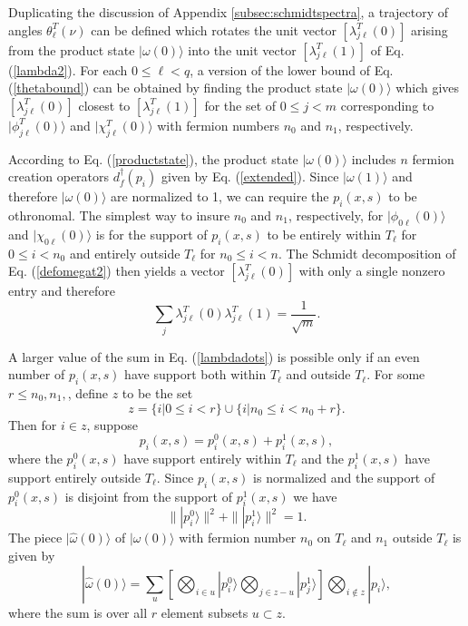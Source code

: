 \documentclass[12pt,amsmath,amssymb,onecolumn]{revtex4-2}
\begin{document}
Duplicating the discussion of Appendix \ref{subsec:schmidtspectra}, a
trajectory of angles $\theta^T_\ell(\nu)$ can be defined which rotates
the unit vector $[ \lambda^T_{j\ell}(0) ]$ arising from the product
state $|\omega(0) \rangle $ into the unit vector $[\lambda^T_{j\ell}(1) ]$ of
Eq. (\ref{lambda2}). For each $0 \le \ell < q$, a version of
the lower bound of Eq. (\ref{thetabound}) can be obtained
by finding the product state $|\omega(0) \rangle $ which gives $[ \lambda^T_{j\ell}(0) ]$ 
closest to $[ \lambda^T_{j\ell}(1) ]$
for the set of $0 \le j < m$
corresponding to $|\phi^T_{j\ell}(0) \rangle $
and $|\chi^T_{j\ell}(0) \rangle $
with
fermion numbers $n_0$ and $n_1$, respectively.

According to Eq. (\ref{productstate}), the product state $|\omega(0) \rangle $ 
includes $n$ fermion creation operators
$ d^\dagger_f( p_i)$ given by
Eq. (\ref{extended}). Since $|\omega(1) \rangle $ and therefore $|\omega(0) \rangle $ are normalized
to 1, we can require the $p_i( x, s)$ 
to be othronomal.
The simplest way to insure $n_0$ and $n_1$, respectively,
for $|\phi_{0\ell}(0) \rangle $
and $|\chi_{0\ell}(0) \rangle $ is for the support of $p_i( x, s)$
to
be entirely within $T_\ell$ for $0 \le i < n_0$ and entirely
outside $T_\ell$ for $n_0 \le i < n$.
The Schmidt decomposition of Eq. (\ref{defomegat2}) then yields
a vector $[ \lambda^T_{j\ell}(0) ]$ with only a single nonzero
entry and therefore
\begin{equation}
  \label{lambdadots}
  \sum_j \lambda^T_{j \ell}(0) \lambda^T_{j \ell}(1) = \frac{1}{\sqrt{m}}.
\end{equation}


A larger value of the sum in Eq. (\ref{lambdadots}) is possible
only if an even number of $p_i(x,s)$ have support both within
$T_\ell$ and outside $T_\ell$.
For some $r \le n_0, n_1,$,
define $z$ to be the set
\begin{equation}
  \label{defsetz}
  z = \{ i | 0 \le i < r \} \cup  \{ i | n_0 \le i < n_0 + r \}.
\end{equation}
Then for $i \in z$, suppose
\begin{equation}
    \label{split0}
    p_i( x, s)  =  p^0_i( x, s) + p^1_i(x, s),
\end{equation}
where the $p^0_i( x, s)$ have support entirely within
$T_\ell$ and the $p^1_i( x, s)$ have support entirely
outside $T_\ell$. Since $p_i(x,s)$ is normalized and
the support of $p^0_i(x,s)$ is disjoint from
the support of $p^1_i(x,s)$ we have
\begin{equation}
  \label{splitnormalization}
  \parallel | p^0_i \rangle  \parallel^2 + \parallel | p^1_i \rangle  \parallel^2  = 1.
\end{equation}
The piece $|\hat{\omega}( 0) \rangle $  of $|\omega( 0) \rangle $ with fermion number
$n_0$ on $T_\ell$ and $n_1$ outside $T_\ell$ 
is given by
\begin{equation}
    \label{defpiecewithn0n1}
    |\hat{\omega}(0) \rangle  =
    \sum_u [\bigotimes_{i \in u} |p^0_i \rangle  \bigotimes_{ j \in z - u } |p^1_j \rangle  ]\bigotimes_{i \notin z} |p_i \rangle ,
\end{equation}
where the sum is over all $r$ element subsets $u \subset z$.
\end{document}

